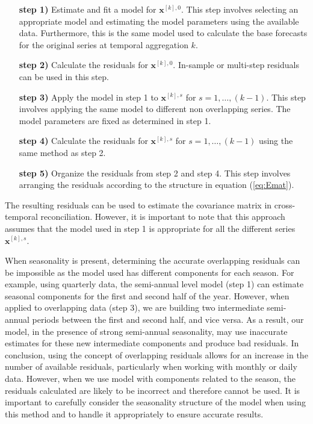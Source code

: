 \documentclass[a4paper,11pt]{article}
\newcommand{\xvet}{\bm{x}}
\theoremstyle{definition}
\begin{document}
\begin{itemize}[leftmargin = 2.5cm, nosep]
	\item[\textbf{step 1)}] Estimate and fit a model for $\xvet^{[k], 0}$. This step involves selecting an appropriate model and estimating the model parameters using the available data. Furthermore, this is the same model used to calculate the base forecasts for the original series at temporal aggregation $k$.
    \item[\textbf{step 2)}] Calculate the residuals for $\xvet^{[k], 0}$. In-sample or multi-step residuals can be used in this step.
    \item[\textbf{step 3)}] Apply the model in step 1 to $\xvet^{[k], s}$ for $s = 1, \dots, (k-1)$. This step involves applying the same model to different non overlapping series. The model parameters are fixed as determined in step 1.
    \item[\textbf{step 4)}] Calculate the residuals for $\xvet^{[k], s}$ for $s = 1, \dots, (k-1)$ using the same method as step 2.
    \item[\textbf{step 5)}] Organize the residuals from step 2 and step 4. This step involves arranging the residuals according to the structure in equation (\ref{eq:Emat}).
\end{itemize}
The resulting residuals can be used to estimate the covariance matrix in cross-temporal reconciliation. However, it is important to note that this approach assumes that the model used in step 1 is appropriate for all the different series $\xvet^{[k], s}$.

When seasonality is present, determining the accurate overlapping residuals can be impossible as the model used has different components for each season. For example, using quarterly data, the semi-annual level model (step 1) can estimate seasonal components for the first and second half of the year. However, when applied to overlapping data (step 3), we are building two intermediate semi-annual periods between the first and second half, and vice versa. As a result, our model, in the presence of strong semi-annual seasonality, may use inaccurate estimates for these new intermediate components and produce bad residuals. In conclusion, using the concept of overlapping residuals allows for an increase in the number of available residuals, particularly when working with monthly or daily data. However, when we use model with components related to the season, the residuals calculated are likely to be incorrect and therefore cannot be used. It is important to carefully consider the seasonality structure of the model when using this method and to handle it appropriately to ensure accurate results.
\end{document}
